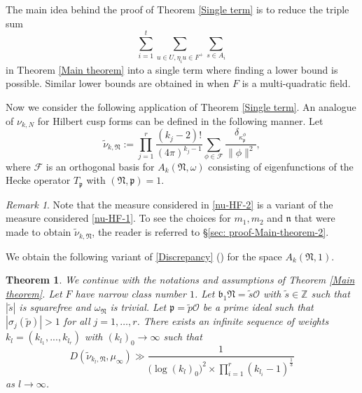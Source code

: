 \documentclass[reqno]{amsart}
\theoremstyle{plain}
\newtheorem{theorem}{Theorem}
\theoremstyle{definition}
\theoremstyle{remark}
\newtheorem{remark}{Remark}
\def\log{\operatorname{log}}
\begin{document}
The main idea behind the proof of Theorem \ref{Single term} is to reduce the triple sum 
$$
\sum_{i=1}^t \sum_{u\in U, \eta_i u\in F^+}\sum_{s\in A_i }
$$
in Theorem \ref{Main theorem}  into a single term where finding a lower bound is possible. Similar lower bounds are obtained in \cite{Das2026} when $F$ is a multi-quadratic field.

   Now we consider the following application of Theorem \ref{Single term}. An analogue of $\nu_{k, N}$ for Hilbert cusp forms can be defined in the following manner. Let 
\begin{equation}\label{nu-HF-2}
\tilde{\nu}_{k,\mathfrak{N}}:=\prod_{j=1}^r  \frac{(k_j-2)!}{  (4\pi)^{k_j-1}}
\sum_{{\phi}\in \mathcal{F} }\frac{\delta_{\kappa^\phi_{\mathfrak{p}}} }{\|\phi\|^2}, 
\end{equation}
where  $\mathcal{F}$ is an orthogonal basis for $A_{k}(\mathfrak{N},\omega)$ consisting of eigenfunctions of the Hecke operator $T_{\mathfrak{p}}$ with $(\mathfrak{N},\mathfrak{p})=1.$
\begin{remark}
    Note that the measure considered in \eqref{nu-HF-2} is a variant of the measure considered \eqref{nu-HF-1}. To see the choices for $m_1, m_2$ and $\mathfrak{n}$ that were made to obtain $\tilde{\nu}_{k,\mathfrak{N}}$, the reader is referred to \S\ref{sec: proof-Main-theorem-2}.
\end{remark}

We obtain the following variant of \eqref{Discrepancy} (\cite[Theorem 1.6]{JS}) for the space $A_k(\mathfrak{N},1)$.

\begin{theorem}\label{Main theorem 2}
   We continue with the notations and assumptions of Theorem \ref{Main theorem}. Let $F$ have narrow class number $1$. Let  $\mathfrak{b}_1\mathfrak{N}=\tilde{s}\mathcal{O} $ with $\tilde{s}\in \mathbb{Z}$ such that $|\tilde{s}|$ is squarefree and  $\omega_{\mathfrak{N}}$ is trivial.  Let   $\mathfrak{p} = \tilde{p}\mathcal{O}$ be a prime ideal such that $|\sigma_j(\tilde{p})| > 1 $ for all $j = 1, \dots, r$.
  There exists an infinite sequence of weights $k_l=(k_{l_1},...,k_{l_r})$ with $(k_{l})_0\rightarrow \infty $  such that  $$D(\tilde{\nu}_{k_l,\mathfrak{N}},\mu_\infty)\gg\frac{1}{\big( \log (k_{l})_0\big)^2  \times\prod_{i=1}^r (k_{l_i}-1)^{\frac{1}{3}}}
 $$
 as $l \to \infty$.
\end{theorem}
\end{document}
